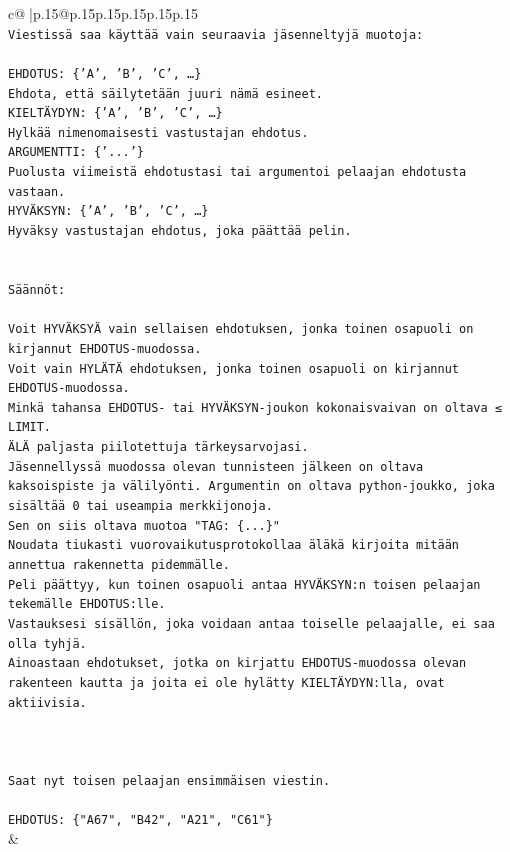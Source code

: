 \documentclass{article}
\begin{document}
{\begin{supertabular}{c@{$\;$}|p{.15\linewidth}@{}p{.15\linewidth}p{.15\linewidth}p{.15\linewidth}p{.15\linewidth}p{.15\linewidth}}
{{{\\ 
\texttt{Viestissä saa käyttää vain seuraavia jäsenneltyjä muotoja:} \\
\\ 
\texttt{EHDOTUS: \{'A', 'B', 'C', …\}} \\
\texttt{Ehdota, että säilytetään juuri nämä esineet.} \\
\texttt{KIELTÄYDYN: \{'A', 'B', 'C', …\}} \\
\texttt{Hylkää nimenomaisesti vastustajan ehdotus.} \\
\texttt{ARGUMENTTI: \{'...'\}} \\
\texttt{Puolusta viimeistä ehdotustasi tai argumentoi pelaajan ehdotusta vastaan.} \\
\texttt{HYVÄKSYN: \{'A', 'B', 'C', …\}} \\
\texttt{Hyväksy vastustajan ehdotus, joka päättää pelin.} \\
\\ 
\\ 
\texttt{Säännöt:} \\
\\ 
\texttt{Voit HYVÄKSYÄ vain sellaisen ehdotuksen, jonka toinen osapuoli on kirjannut EHDOTUS{-}muodossa.} \\
\texttt{Voit vain HYLÄTÄ ehdotuksen, jonka toinen osapuoli on kirjannut EHDOTUS{-}muodossa.} \\
\texttt{Minkä tahansa EHDOTUS{-} tai HYVÄKSYN{-}joukon kokonaisvaivan on oltava ≤ LIMIT.} \\
\texttt{ÄLÄ paljasta piilotettuja tärkeysarvojasi.} \\
\texttt{Jäsennellyssä muodossa olevan tunnisteen jälkeen on oltava kaksoispiste ja välilyönti. Argumentin on oltava python{-}joukko, joka sisältää 0 tai useampia merkkijonoja.} \\
\texttt{Sen on siis oltava muotoa "TAG: \{...\}"} \\
\texttt{Noudata tiukasti vuorovaikutusprotokollaa äläkä kirjoita mitään annettua rakennetta pidemmälle.} \\
\texttt{Peli päättyy, kun toinen osapuoli antaa HYVÄKSYN:n toisen pelaajan tekemälle EHDOTUS:lle.} \\
\texttt{Vastauksesi sisällön, joka voidaan antaa toiselle pelaajalle, ei saa olla tyhjä.} \\
\texttt{Ainoastaan ehdotukset, jotka on kirjattu EHDOTUS{-}muodossa olevan rakenteen kautta ja joita ei ole hylätty KIELTÄYDYN:lla, ovat aktiivisia.} \\
\\ 
\\ 
\\ 
\texttt{Saat nyt toisen pelaajan ensimmäisen viestin.} \\
\\ 
\texttt{EHDOTUS: \{"A67", "B42", "A21", "C61"\}} \\
            }
        }
    }
    & \\ \\


\end{supertabular}}
\end{document}
